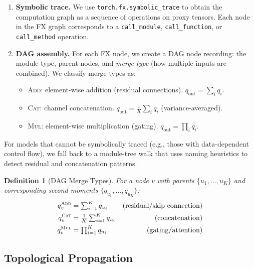 \documentclass[10pt]{article}
\newtheorem{definition}[theorem]{Definition}
\begin{document}
\begin{enumerate}[nosep]
    \item \textbf{Symbolic trace.} We use \texttt{torch.fx.symbolic\_trace} to obtain the computation graph as a sequence of operations on proxy tensors.  Each node in the FX graph corresponds to a \texttt{call\_module}, \texttt{call\_function}, or \texttt{call\_method} operation.
    \item \textbf{DAG assembly.} For each FX node, we create a DAG node recording: the module type, parent nodes, and \emph{merge type} (how multiple inputs are combined).  We classify merge types as:
    \begin{itemize}[nosep]
        \item \textsc{Add}: element-wise addition (residual connections).  $q_{\mathrm{out}} = \sum_i q_i$.
        \item \textsc{Cat}: channel concatenation.  $q_{\mathrm{out}} = \frac{1}{K}\sum_i q_i$ (variance-averaged).
        \item \textsc{Mul}: element-wise multiplication (gating).  $q_{\mathrm{out}} = \prod_i q_i$.
    \end{itemize}
\end{enumerate}

For models that cannot be symbolically traced (e.g., those with data-dependent control flow), we fall back to a module-tree walk that uses naming heuristics to detect residual and concatenation patterns.

\begin{definition}[DAG Merge Types]
\label{def:merge-types}
For a node $v$ with parents $\{u_1, \ldots, u_K\}$ and corresponding second moments $\{q_{u_1}, \ldots, q_{u_K}\}$:
\begin{align}
q_v^{\textsc{Add}} &= \textstyle\sum_{i=1}^K q_{u_i} & \text{(residual/skip connection)} \label{eq:merge-add} \\
q_v^{\textsc{Cat}} &= \textstyle\frac{1}{K}\sum_{i=1}^K q_{u_i} & \text{(concatenation)} \label{eq:merge-cat} \\
q_v^{\textsc{Mul}} &= \textstyle\prod_{i=1}^K q_{u_i} & \text{(gating/attention)} \label{eq:merge-mul}
\end{align}
\end{definition}

\subsection{Topological Propagation}
\label{subsec:topo-prop}
\end{document}
